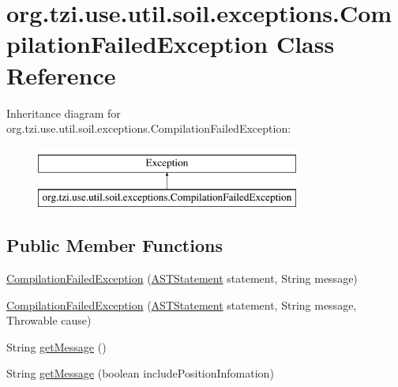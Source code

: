 \hypertarget{classorg_1_1tzi_1_1use_1_1util_1_1soil_1_1exceptions_1_1_compilation_failed_exception}{\section{org.\-tzi.\-use.\-util.\-soil.\-exceptions.\-Compilation\-Failed\-Exception Class Reference}
\label{classorg_1_1tzi_1_1use_1_1util_1_1soil_1_1exceptions_1_1_compilation_failed_exception}
}
Inheritance diagram for org.\-tzi.\-use.\-util.\-soil.\-exceptions.\-Compilation\-Failed\-Exception\-:\begin{figure}[H]
\begin{center}
\leavevmode
\includegraphics[height=2.000000cm]{classorg_1_1tzi_1_1use_1_1util_1_1soil_1_1exceptions_1_1_compilation_failed_exception}
\end{center}
\end{figure}
\subsection*{Public Member Functions}
\begin{DoxyCompactItemize}
\item 
\hyperlink{classorg_1_1tzi_1_1use_1_1util_1_1soil_1_1exceptions_1_1_compilation_failed_exception_a08467cac127a6b0c0801941520bb47bd}{Compilation\-Failed\-Exception} (\hyperlink{classorg_1_1tzi_1_1use_1_1parser_1_1soil_1_1ast_1_1_a_s_t_statement}{A\-S\-T\-Statement} statement, String message)
\item 
\hyperlink{classorg_1_1tzi_1_1use_1_1util_1_1soil_1_1exceptions_1_1_compilation_failed_exception_aa242501194e8a89f460e88106079b3a6}{Compilation\-Failed\-Exception} (\hyperlink{classorg_1_1tzi_1_1use_1_1parser_1_1soil_1_1ast_1_1_a_s_t_statement}{A\-S\-T\-Statement} statement, String message, Throwable cause)
\item 
String \hyperlink{classorg_1_1tzi_1_1use_1_1util_1_1soil_1_1exceptions_1_1_compilation_failed_exception_af901a3486fce9fb1237cda93f1b9f36e}{get\-Message} ()
\item 
String \hyperlink{classorg_1_1tzi_1_1use_1_1util_1_1soil_1_1exceptions_1_1_compilation_failed_exception_a1a5616148ded3001535fd96fe204a9e1}{get\-Message} (boolean include\-Position\-Infomation)
\end{DoxyCompactItemize}


